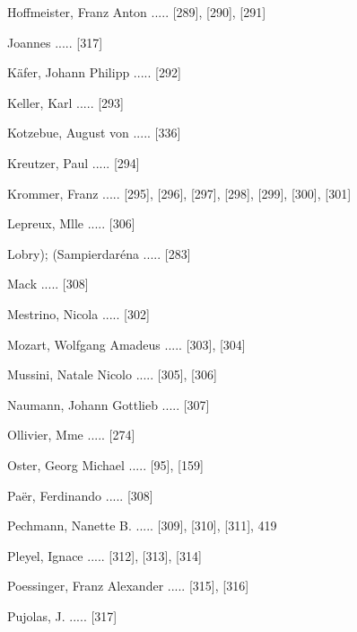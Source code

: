 \documentclass[twocolumn, 12pt]{book}
\begin{document}
\newline 
Hoffmeister, Franz Anton ..... [289], [290], [291]

\newline 
Joannes ..... [317]

\newline 
Käfer, Johann Philipp ..... [292]

\newline 
Keller, Karl ..... [293]

\newline 
Kotzebue, August von ..... [336]

\newline 
Kreutzer, Paul ..... [294]

\newline 
Krommer, Franz ..... [295], [296], [297], [298], [299], [300], [301]

\newline 
Lepreux, Mlle ..... [306]

\newline 
Lobry); (Sampierdaréna ..... [283]

\newline 
Mack ..... [308]

\newline 
Mestrino, Nicola ..... [302]

\newline 
Mozart, Wolfgang Amadeus ..... [303], [304]

\newline 
Mussini, Natale Nicolo ..... [305], [306]

\newline 
Naumann, Johann Gottlieb ..... [307]

\newline 
Ollivier, Mme ..... [274]

\newline 
Oster, Georg Michael ..... [95], [159]

\newline 
Paër, Ferdinando ..... [308]

\newline 
Pechmann, Nanette B. ..... [309], [310], [311], 419

\newline 
Pleyel, Ignace ..... [312], [313], [314]

\newline 
Poessinger, Franz Alexander ..... [315], [316]

\newline 
Pujolas, J. ..... [317]
\end{document}
